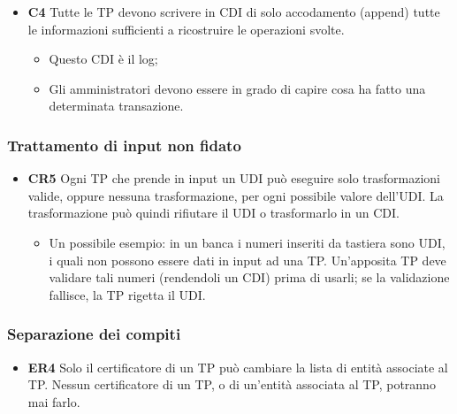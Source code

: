 \begin{itemize}
      \item \textbf{C4} Tutte le TP devono scrivere in CDI di solo accodamento
            (append) tutte le informazioni
            sufficienti a ricostruire le operazioni svolte.
            \begin{itemize}
                  \item Questo CDI è il log;
                  \item Gli amministratori devono essere in grado di capire
                        cosa ha fatto una determinata
                        transazione.
            \end{itemize}
\end{itemize}

\subsubsection{Trattamento di input non fidato}

\begin{itemize}
      \item \textbf{CR5} Ogni TP che prende in input un UDI può eseguire solo
            trasformazioni valide, oppure
            nessuna trasformazione, per ogni possibile valore dell'UDI.
            La trasformazione può quindi rifiutare il
            UDI o trasformarlo in un CDI.
            \begin{itemize}
                  \item Un possibile esempio: in un banca i numeri inseriti
                        da tastiera sono UDI, i quali non possono essere dati in input
                        ad una TP. Un'apposita TP deve validare tali numeri
                        (rendendoli un CDI) prima di usarli; se
                        la validazione fallisce, la TP rigetta il UDI.
            \end{itemize}
\end{itemize}

\subsubsection{Separazione dei compiti}

\begin{itemize}
      \item \textbf{ER4} Solo il certificatore di un TP può cambiare la lista di
            entità associate al TP. Nessun
            certificatore di un TP, o di un'entità associata al TP, potranno mai
            farlo.
\end{itemize}

